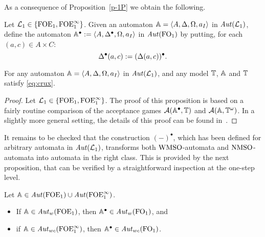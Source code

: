 \noindent{}

As a consequence of Proposition~\ref{p-1P} we obtain the following.

\begin{definition}
Let $\mathcal{L}_1\in \{{\mathrm{FOE}_1},{\mathrm{FOE}^{\infty}_1}\}$.
Given an automaton $\mathbb{A} = \langle{A,\Delta,\Omega,a_{I}}\rangle$ in $\mathit{Aut}(\mathcal{L}_1)$, define 
the automaton $\mathbb{A}^{\bullet} \mathrel{: =} \langle{A,\Delta^{\bullet},\Omega,a_{I}}\rangle$ in 
$\mathit{Aut}(\mathrm{FO}_1)$ by putting, for each $(a,c) \in A \times C$:
\[
\Delta^{\bullet}(a,c) \mathrel{: =} (\Delta(a,c))^{\bullet}.
\]
\end{definition}

\begin{proposition}
For any automaton $\mathbb{A} = \langle{A,\Delta,\Omega,a_{I}}\rangle$ in $\mathit{Aut}(\mathcal{L}_1)$, and any
model $\mathbb{T}$, $\mathbb{A}$ and $\mathbb{T}$ satisfy \eqref{eq:crux}.
\end{proposition}

\begin{proof} Let $\mathcal{L}_1\in \{{\mathrm{FOE}_1},{\mathrm{FOE}^{\infty}_1}\}$.
The proof of this proposition is based on a fairly routine comparison of the 
acceptance games $\mathcal{A}(\mathbb{A}^{\bullet},\mathbb{T})$ and 
$\mathcal{A}(\mathbb{A},\mathbb{T}^{\omega})$.
In a slightly more general setting, the details of this proof can be found 
in~\cite{Venxx}.
\end{proof}
\medskip

It remains to be checked that the construction $(-)^{\bullet}$, which has
been defined for arbitrary automata in $\mathit{Aut}(\mathcal{L}_1)$, transforms 
both $\mathrm{WMSO}$-automata and $\mathrm{NMSO}$-automata into automata in the right class.%
This is provided by the next proposition, that can be verified by a straightforward inspection at the 
one-step level.
\begin{proposition}
Let $\mathbb{A} \in \mathit{Aut}(\mathrm{FOE}_1)\cup\mathit{Aut}(\mathrm{FOE}^{\infty}_1)$. 
\begin{itemize}
\item If $\mathbb{A} \in \mathit{Aut}_{w}(\mathrm{FOE}_1)$, then $\mathbb{A}^{\bullet} \in \mathit{Aut}_{w}(\mathrm{FO}_1)$, and
\item if $\mathbb{A} \in \mathit{Aut}_{wc}(\mathrm{FOE}^{\infty}_1)$, then $\mathbb{A}^{\bullet} \in \mathit{Aut}_{wc}(\mathrm{FO}_1)$.
\end{itemize}
\end{proposition}

